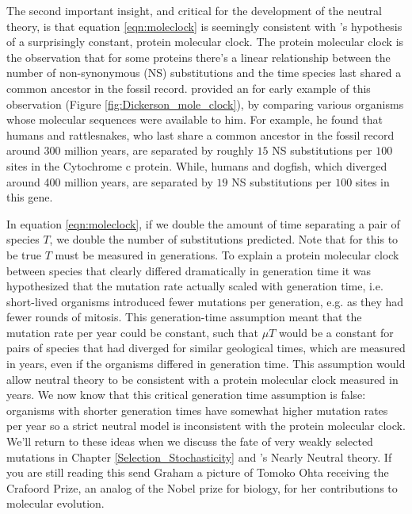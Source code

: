 The second important insight, and critical for the development of the neutral theory, is that equation \eqref{eqn:moleclock} is seemingly consistent with \citet{zuckerkandl1965evolutionary}'s hypothesis of a surprisingly constant, protein molecular clock. The protein molecular clock is the observation that for some proteins there's a linear relationship between the number of non-synonymous (NS) substitutions and the time species last shared a common ancestor in the fossil record. \citet{dickerson1971structure} provided an for early example of this observation (Figure \ref{fig:Dickerson_mole_clock}), by comparing various organisms whose molecular sequences were available to him. For example, he found that humans and rattlesnakes, who last share a common ancestor in the fossil record around 300 million years, are separated by roughly $15$ NS substitutions per $100$ sites in the Cytochrome c protein.
While, humans and dogfish, which diverged around 400 million years, are separated by $19$ NS substitutions per $100$ sites in this gene. \\ 

In equation \eqref{eqn:moleclock}, if we double the amount of time separating a pair of species $T$, we double the number of substitutions predicted. Note that for this to be true $T$ must be measured in generations. To explain a protein molecular clock between species that clearly differed dramatically in generation time it was hypothesized that the mutation rate actually scaled with generation time, i.e. short-lived organisms introduced fewer mutations per generation, e.g. as they had fewer rounds of mitosis. This generation-time assumption meant that the mutation rate per year could be constant, such that $\mu T$ would be a constant for pairs of species that had diverged for similar geological times, which are measured in years, even if the organisms differed in generation time. This assumption would allow neutral theory to be consistent with a protein molecular clock measured in years. We now know that this critical generation time assumption is false: organisms with shorter generation times have somewhat higher mutation rates per year so a strict neutral model is inconsistent with the protein molecular clock. We'll return to these ideas when we discuss the fate of very weakly selected mutations in Chapter \ref{Selection_Stochasticity} and \citet{ohta1973slightly}'s Nearly Neutral theory. If you are still reading this send Graham a picture of Tomoko Ohta receiving the Crafoord Prize, an analog of the Nobel prize for biology, for her contributions to molecular evolution.


